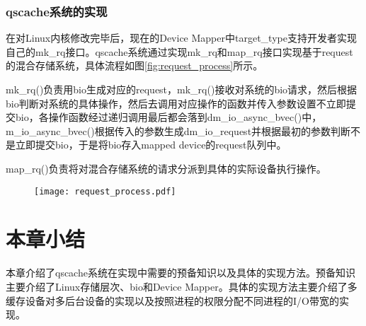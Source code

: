 \subsubsection{qscache系统的实现}


在对Linux内核修改完毕后，现在的Device Mapper中target\_type支持开发者实现自己的mk\_rq接口。qscache系统通过实现mk\_rq和map\_rq接口实现基于request的混合存储系统，具体流程如图\ref{fig:request_process}所示。

mk\_rq()负责用bio生成对应的request，mk\_rq()接收对系统的bio请求，然后根据bio判断对系统的具体操作，然后去调用对应操作的函数并传入参数设置不立即提交bio，各操作函数经过递归调用最后都会落到dm\_io\_async\_bvec()中，m\_io\_async\_bvec()根据传入的参数生成dm\_io\_request并根据最初的参数判断不是立即提交bio，于是将bio存入mapped device的request队列中。

map\_rq()负责将对混合存储系统的请求分派到具体的实际设备执行操作。

\begin{figure}[!htp]
    \centering
    \texttt{[image: request\_process.pdf]}
\end{figure}


\section{本章小结}

本章介绍了qscache系统在实现中需要的预备知识以及具体的实现方法。预备知识主要介绍了Linux存储层次、bio和Device Mapper。具体的实现方法主要介绍了多缓存设备对多后台设备的实现以及按照进程的权限分配不同进程的I/O带宽的实现。